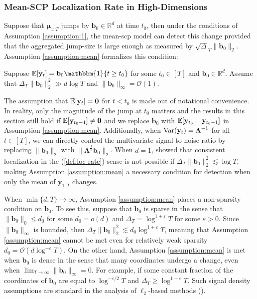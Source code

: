 \subsubsection{Mean-SCP Localization Rate in High-Dimensions}

Suppose that $\boldsymbol{\mu}_{1:T}$ jumps by $\mathbf{b}_0\in\mathbb{R}^d$ at time $t_0$, then under the conditions of Assumption \ref{assumption:1}, the mean-scp model can detect this change provided that the aggregated jump-size is large enough as measured by $\sqrt\Delta_T\lVert \mathbf{b}_0 \rVert_2$. Assumption \ref{assumption:mean} formalizes this condition:

\begin{assumption}\label{assumption:mean}  
    Suppose $\E[\mathbf{y}_t] = \mathbf{b}_0\mathbbm{1}\{t \geq t_0\}$ for some $t_0 \in [T]$ and $\mathbf{b}_0\in\mathbb{R}^d$. Assume that $\Delta_T\lVert \mathbf{b}_0 \rVert^2_2 \gg d\log T$ and $\lVert\mathbf{b}_0\rVert_\infty = \mathcal{O}(1)$.
\end{assumption}
\vspace{-5pt}

The assumption that $\mathbb{E}[\mathbf{y}_t] = \mathbf{0}$ for $t < t_0$ is made out of notational convenience. In reality, only the magnitude of the jump at $t_0$ matters and the results in this section still hold if $\mathbb{E}[\mathbf{y}_{t_0-1}]\neq \mathbf{0}$ and we replace $\mathbf{b}_0$ with $\mathbb{E}[\mathbf{y}_{t_0} -\mathbf{y}_{t_0-1}]$ in Assumption \ref{assumption:mean}. Additionally, when $\normalfont{\text{\normalfont Var}}(\mathbf{y}_t) = \boldsymbol{\Lambda}^{-1}$ for all $t \in [T]$, we can directly control the multivariate signal-to-noise ratio by replacing $\lVert \mathbf{b}_0\rVert_2$ with $\lVert \boldsymbol{\Lambda}^{\frac{1}{2}} \mathbf{b}_0\rVert_2$. When $d=1$, \cite{Wang20} showed that consistent localization in the (\ref{def:loc-rate}) sense is not possible if $\Delta_T\lVert \mathbf{b}_0 \rVert^2_2 \lesssim\log T$, making Assumption \ref{assumption:mean} a necessary condition for detection when only the mean of $\mathbf{y}_{1:T}$ changes.

When $\min\{d,T\}\to\infty$, Assumption \ref{assumption:mean} places a non-sparsity condition on $\mathbf{b}_0$. To see this, suppose that $\mathbf{b}_0$ is sparse in the sense that $\lVert\mathbf{b}_0\rVert_0 \leq d_0$ for some $d_0 = o(d)$ and $\Delta_T = \log^{1+\varepsilon} T$ for some $\varepsilon > 0$. Since $\lVert \mathbf{b}_0\rVert_\infty$ is bounded, then $\Delta_T\lVert \mathbf{b}_0 \rVert^2_2 \lesssim d_0\log^{1+\varepsilon}T$, meaning that Assumption \ref{assumption:mean} cannot be met even for relatively weak sparsity $d_0 = \mathcal{O}(d\log^{-\varepsilon} T)$. On the other hand, Assumption \ref{assumption:mean} is met when $\mathbf{b}_0$ is dense in the sense that many coordinates undergo a change, even when $\lim_{T\to\infty}\lVert \mathbf{b}_0\rVert_\infty = 0$. For example, if some constant fraction of the coordinates of $\mathbf{b}_0$ are equal to $\log^{-\varepsilon/2}T$ and $\Delta_T \geq \log^{1+\varepsilon}T$. Such signal density assumptions are standard in the analysis of $\ell_2$-based methods (\citealp{Bai10, Horváth12, Li23}).

